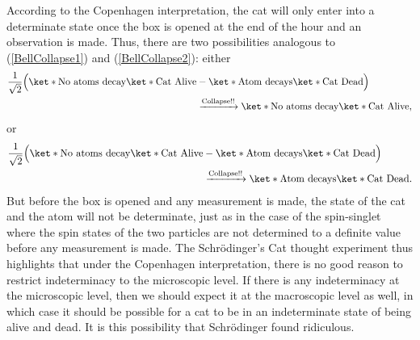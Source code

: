 \documentclass[12pt]{report}
\begin{document}
    According to the Copenhagen interpretation, the cat will only enter into a determinate state once the box is opened at the end of the hour and an observation is made. Thus, there are two possibilities analogous to (\ref{BellCollapse1}) and (\ref{BellCollapse2}): either
\begin{equation*}
    \begin{split}
\frac{1}{\sqrt{2}}\Big(\ket*{\text{No atoms decay}}\ket*{\text{Cat Alive}}&-\ket*{\text{Atom decays}}\ket*{\text{Cat Dead}}\Big)\\
&\xrightarrow{\text{Collapse!!}}\ket*{\text{No atoms decay}}\ket*{\text{Cat Alive}},
\end{split}
\end{equation*}
or
\begin{equation*}
\begin{split}
\frac{1}{\sqrt{2}}\Big(\ket*{\text{No atoms decay}}\ket*{\text{Cat Alive}}&-\ket*{\text{Atom decays}}\ket*{\text{Cat Dead}}\Big)\\
&\xrightarrow{\text{Collapse!!}}\ket*{\text{Atom decays}}\ket*{\text{Cat Dead}}.
\end{split}
\end{equation*}
But before the box is opened and any measurement is made, the state of the cat and the atom will not be determinate, just as in the case of the spin-singlet where the spin states of the two particles are not determined to a definite value before any measurement is made. The Schr\"{o}dinger's Cat thought experiment thus highlights that under the Copenhagen interpretation, there is no good reason to restrict  indeterminacy to the microscopic level. If there is any indeterminacy at the microscopic level, then we should expect it at the macroscopic level as well, in which case it should be possible for a cat to be in an indeterminate state of being alive and dead. It is this possibility that Schr\"{o}dinger found ridiculous. 







\end{document}
